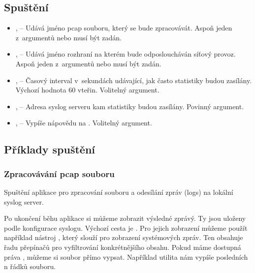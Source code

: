 \documentclass[11pt, a4paper, titlepage]{article}
\begin{document}
\subsection{Spuštění}


\begin{itemize}
	\item {},  -- Udává jméno pcap souboru, který se bude zpracovávát. Aspoň jeden z~argumentů  nebo  musí být zadán.

	\item {},  -- Udává jméno rozhraní na kterém bude odposloucháván síťový provoz. Aspoň jeden z~argumentů  nebo  musí být zadán.

	\item {},  -- Časový interval v~sekundách udávající, jak často statistiky budou zasílány. Výchozí hodnota 60 vteřin. Volitelný argument.

	\item {},  -- Adresa syslog serveru kam statistiky budou zasílány. Povinný argument.

	\item {},  -- Vypíše nápovědu na . Volitelný argument.
\end{itemize}
\smallskip



\subsection{Příklady spuštění}

\subsubsection{Zpracovávání pcap souboru}

Spuštění aplikace pro zpracování  souboru a odesílání zpráv (logs) na lokální syslog server.

\begin{center}
\end{center}

Po ukončení běhu aplikace si můžeme zobrazit výsledné zprávý. Ty jsou uloženy podle konfigurace syslogu. Výchozí cesta je . Pro jejich zobrazení můžeme použít například nástroj , který slouží pro zobrazení systémových zpráv. Ten obsahuje řadu přepínačů pro vyfiltrování konkrétnějšího obsahu. Pokud máme dostupná práva , můžeme si soubor přímo vypsat. Například utilita  nám vypíše posledních n řádků souboru.
\end{document}
